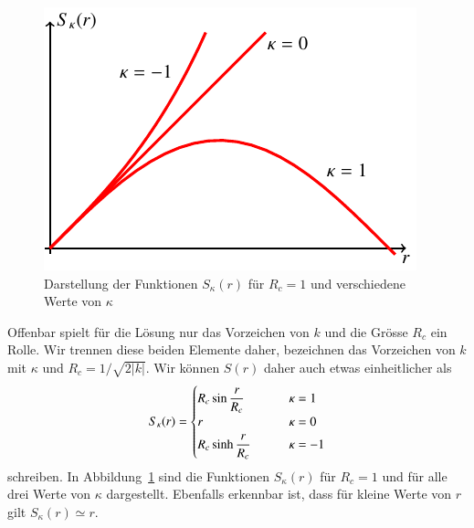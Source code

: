\begin{figure}
\centering
\includegraphics{chapters/tikz/robertson.pdf}
\caption{Darstellung der Funktionen $S_\kappa(r)$ für $R_c=1$ und
verschiedene Werte von $\kappa$
\label{skript:Skappa:graph}}
\end{figure}

Offenbar spielt für die Lösung  nur das Vorzeichen von $k$ und die
Grösse $R_c$ ein Rolle.
Wir trennen diese beiden Elemente daher, bezeichnen das Vorzeichen
von $k$ mit $\kappa$ und $R_c = 1/\sqrt{2|k|}$.
Wir können $S(r)$ daher auch etwas einheitlicher als
\begin{equation}
S_\kappa(r) = \begin{cases}
R_c\sin  \displaystyle\frac{\mathstrut r}{R_c} &\qquad \kappa= 1\\
r                                              &\qquad \kappa= 0\\
R_c\sinh \displaystyle\frac{\mathstrut r}{R_c} &\qquad \kappa=-1
\end{cases}
\label{skript:rwmetrik:Skappa}
\end{equation}
schreiben.
In Abbildung~\ref{skript:Skappa:graph} sind die Funktionen $S_\kappa(r)$
für $R_c=1$ und für alle drei Werte von $\kappa$ dargestellt.
Ebenfalls erkennbar ist, dass für kleine Werte von $r$ gilt
$S_\kappa(r)\simeq r$.

